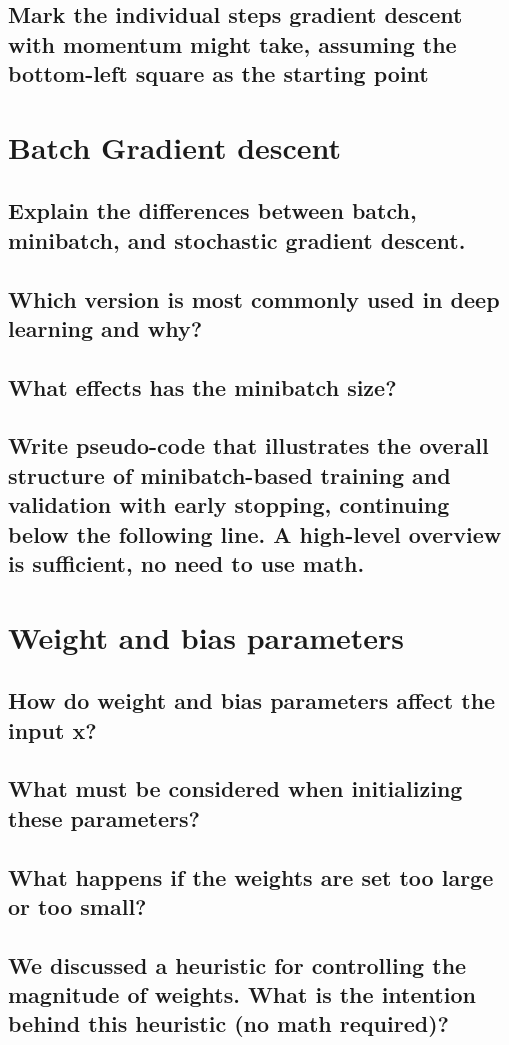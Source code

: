 \subsection{Mark the individual steps gradient descent with momentum might take, assuming the bottom-left square as the starting point}

\section{Batch Gradient descent}
\subsection{Explain the differences between batch, minibatch, and stochastic gradient descent.}
\subsection{Which version is most commonly used in deep learning and why?}
\subsection{What effects has the minibatch size?}
\subsection{Write pseudo-code that illustrates the overall structure of minibatch-based training and validation with early stopping, continuing below the following line. A high-level overview is sufficient, no need to use math.}

\section{Weight and bias parameters}
\subsection{How do weight and bias parameters affect the input x?}
\subsection{What must be considered when initializing these parameters?}
\subsection{What happens if the weights are set too large or too small?}
\subsection{We discussed a heuristic for controlling the magnitude of weights. What is the intention behind this heuristic (no math required)?}

